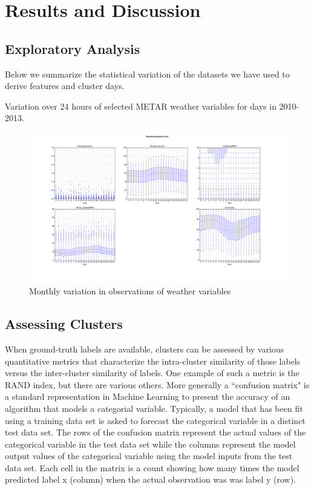 \documentclass[11pt]{scrartcl}
\begin{document}
\newpage\noindent
\section{Results and Discussion}
\subsection{Exploratory Analysis}
Below we summarize the statistical variation of the datasets we have used to derive features and cluster days.  

Variation over 24 hours of selected METAR weather variables for days in 2010-2013.

\begin{figure}[htbp]
\begin{center}
\includegraphics[scale=0.25]{./figures/boxplot_hourlyvariation.png}
\caption{Monthly variation in observations of weather variables}
\label{default}
\end{center}
\end{figure}

\subsection{Assessing Clusters}
When ground-truth labels are available, clusters can be assessed by various quantitative metrics that characterize the intra-cluster similarity of those labels versus the inter-cluster similarity of labels.  One example of such a metric is the RAND index, but there are various others.  More generally a ``confusion matrix" is a standard representation in Machine Learning to present the accuracy of an algorithm that models a categorial variable.  Typically, a model that has been fit using a training data set is asked to forecast the categorical variable in a distinct test data set.  The rows of the confusion matrix represent the actual values of the categorical variable in the test data set while the columns represent the model output values of the categorical variable using the model inputs from the test data set.  Each cell in the matrix is a count showing how many times the model predicted label x (column) when the actual observation was was label y (row).
\end{document}

